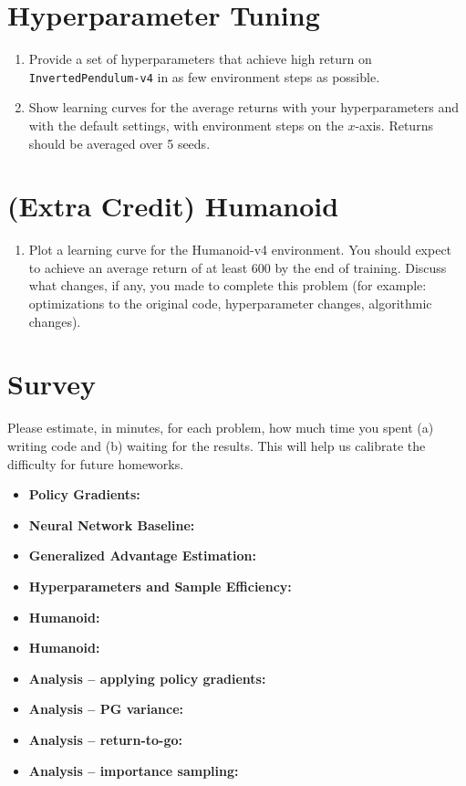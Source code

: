 \documentclass{article}
\begin{document}
\newpage\section{Hyperparameter Tuning}
\begin{enumerate}
        \item Provide a set of hyperparameters that achieve high return on \verb|InvertedPendulum-v4| in as few environment steps as possible.
        \item Show learning curves for the average returns with your hyperparameters and with the default settings, with environment steps on the $x$-axis. Returns should be averaged over 5 seeds.
\end{enumerate}

\newpage\section{(Extra Credit) Humanoid}
\begin{enumerate}
        \item Plot a learning curve for the Humanoid-v4 environment. You should expect to achieve an average return of at least 600 by the end of training. Discuss what changes, if any, you made to complete this problem (for example: optimizations to the original code, hyperparameter changes, algorithmic changes).
\end{enumerate}



\setcounter{section}{8}
\newpage\section{Survey}
\label{sec:survey}
Please estimate, in minutes, for each problem, how much time you spent (a) writing code and (b) waiting for the results. This will help us calibrate the difficulty for future homeworks. 
\begin{itemize}
        \item \textbf{Policy Gradients:}
        \item \textbf{Neural Network Baseline:}
        \item \textbf{Generalized Advantage Estimation:}
        \item \textbf{Hyperparameters and Sample Efficiency:}
        \item \textbf{Humanoid:}
        \item \textbf{Humanoid:}
        \item \textbf{Analysis -- applying policy gradients:}
        \item \textbf{Analysis -- PG variance:}
        \item \textbf{Analysis -- return-to-go:}
        \item \textbf{Analysis -- importance sampling:}
\end{itemize}
\end{document}

